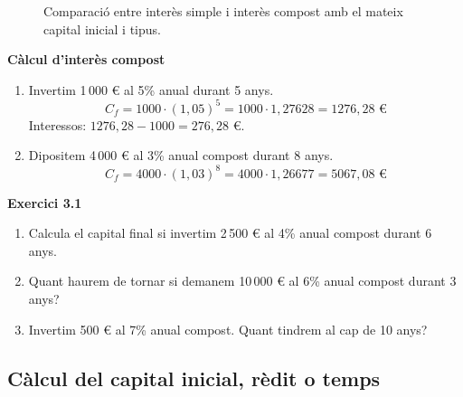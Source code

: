 \documentclass[12pt]{article}
\begin{document}
\begin{figure}[H]
\centering
{}
\caption{Comparació entre interès simple i interès compost amb el mateix capital inicial i tipus.}
\end{figure}

\begin{exemple}
\textbf{Càlcul d'interès compost}
\begin{enumerate}[label=\alph*)]
    \item Invertim 1\,000 € al 5\% anual durant 5 anys.
    \[
    C_f = 1000 \cdot (1{,}05)^5 = 1000 \cdot 1{,}27628 = 1276{,}28 \text{ €}
    \]
    Interessos: $1276{,}28 - 1000 = 276{,}28$ €.
    \item Dipositem 4\,000 € al 3\% anual compost durant 8 anys.
    \[
    C_f = 4000 \cdot (1{,}03)^8 = 4000 \cdot 1{,}26677 = 5067{,}08 \text{ €}
    \]
\end{enumerate}
\end{exemple}

\begin{exercici}
\textbf{Exercici 3.1}\\
\begin{enumerate}[label=\alph*)]
    \item Calcula el capital final si invertim 2\,500 € al 4\% anual compost durant 6 anys.
    \item Quant haurem de tornar si demanem 10\,000 € al 6\% anual compost durant 3 anys?
    \item Invertim 500 € al 7\% anual compost. Quant tindrem al cap de 10 anys?
\end{enumerate}
\end{exercici}

\subsection{Càlcul del capital inicial, rèdit o temps}
\end{document}
